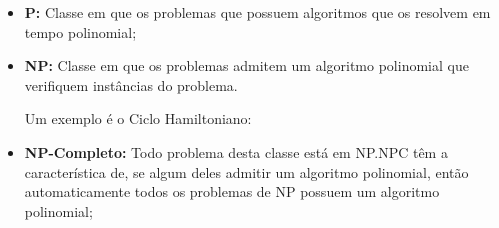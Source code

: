 \documentclass[a4paper,oneside,article,table]{article}
\begin{document}
\begin{itemize}
    \item \textbf{P:} Classe em que os problemas que possuem algoritmos que os resolvem em tempo polinomial;
    \item \begin{multicols}{2}
            \textbf{NP:} Classe em que os problemas admitem um algoritmo polinomial que verifiquem instâncias do problema. \par
            Um exemplo é o Ciclo Hamiltoniano:
            \vfill

        \begin{center}
        \end{center}

    \end{multicols}

    \item \textbf{NP-Completo:} Todo problema desta classe está em NP.\@Problemas NPC têm a característica de, se algum deles admitir um algoritmo polinomial, então automaticamente todos os problemas de NP possuem um algoritmo polinomial;
    
\end{itemize}
\end{document}
